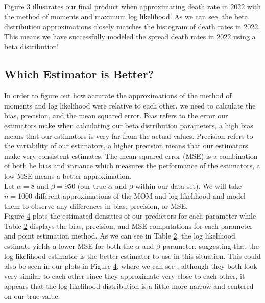 \documentclass{article}\usepackage[]{graphicx}\usepackage[]{xcolor}
\begin{document}
\begin{multicols}{2}
\columnbreak

Figure \hyperref[fig3]{3} illustrates our final product when approximating death rate in 2022 with the method of moments and maximum log likelihood. As we can see, the beta distribution approximations closely matches the histogram of death rates in 2022. This means we have successfully modeled the spread death rates in 2022 using a beta distribution!

\subsection{Which Estimator is Better?}
In order to figure out how accurate the approximations of the method of moments and log likelihood were relative to each other, we need to calculate the bias, precision, and the mean squared error. Bias refers to the error our estimators make when calculating our beta distribution parameters, a high bias means that our estimators is very far from the actual values. Precision refers to the variability of our estimators, a higher precision means that our estimators make very consistent estimates. The mean squared error (MSE) is a combination of both he bias and variance which measures the performance of the estimators, a low MSE means a better approximation. \\

Let $\alpha = 8$ and $\beta = 950$ (our true $\alpha$ and $\beta$ within our data set). We will take $n = 1000$ different approximations of the MOM and log likelihood and model them to observe any differences in bias, precision, or MSE. \\

Figure \hyperref[fig4]{4} plots the estimated densities of our predictors for each parameter while Table \hyperref[tab2]{2} displays the bias, precision, and MSE computations for each parameter and point estimation method. As we can see in Table \hyperref[tab2]{2}, the log likelihood estimate yields a lower MSE for both the $\alpha$ and $\beta$ parameter, suggesting that the log likelihood estimator is the better estimator to use in this situation. This could also be seen in our plots in Figure \hyperref[fig4]{4}, where we can see , although they both look very similar to each other since they approximate very close to each other, it appears that the log likelihood distribution is a little more narrow and centered on our true value.


\vspace{2em}

\begin{tiny}

\end{tiny}
\end{multicols}
\end{document}
